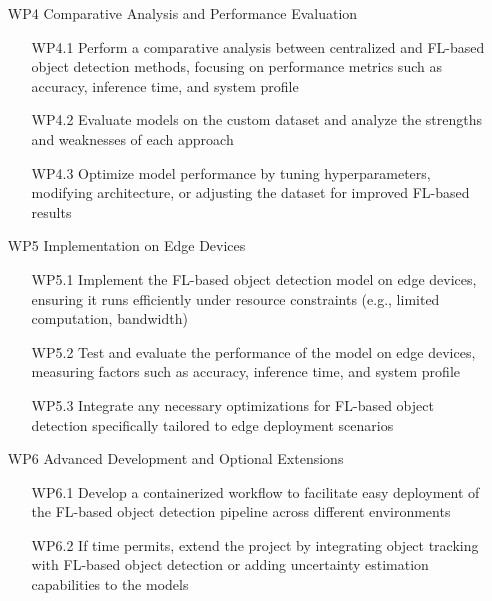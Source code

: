 \documentclass[thesis]{mas_proposal}
\begin{document}
\begin{enumerate}
      \item[WP4] Comparative Analysis and Performance Evaluation
            \begin{itemize}
                  \item[WP4.1] Perform a comparative analysis between centralized and FL-based object detection methods, focusing on performance metrics such as accuracy, inference time, and system profile
                  \item[WP4.2] Evaluate models on the custom dataset and analyze the strengths and weaknesses of each approach
                  \item[WP4.3] Optimize model performance by tuning hyperparameters, modifying architecture, or adjusting the dataset for improved FL-based results
            \end{itemize}

      \item[WP5] Implementation on Edge Devices
            \begin{itemize}
                  \item[WP5.1] Implement the FL-based object detection model on edge devices, ensuring it runs efficiently under resource constraints (e.g., limited computation, bandwidth)
                  \item[WP5.2] Test and evaluate the performance of the model on edge devices, measuring factors such as accuracy, inference time, and system profile
                  \item[WP5.3] Integrate any necessary optimizations for FL-based object detection specifically tailored to edge deployment scenarios
            \end{itemize}

      \item[WP6] Advanced Development and Optional Extensions
            \begin{itemize}
                  \item[WP6.1] Develop a containerized workflow to facilitate easy deployment of the FL-based object detection pipeline across different environments
                  \item[WP6.2] If time permits, extend the project by integrating object tracking with FL-based object detection or adding uncertainty estimation capabilities to the models
            \end{itemize}


\end{enumerate}
\end{document}
